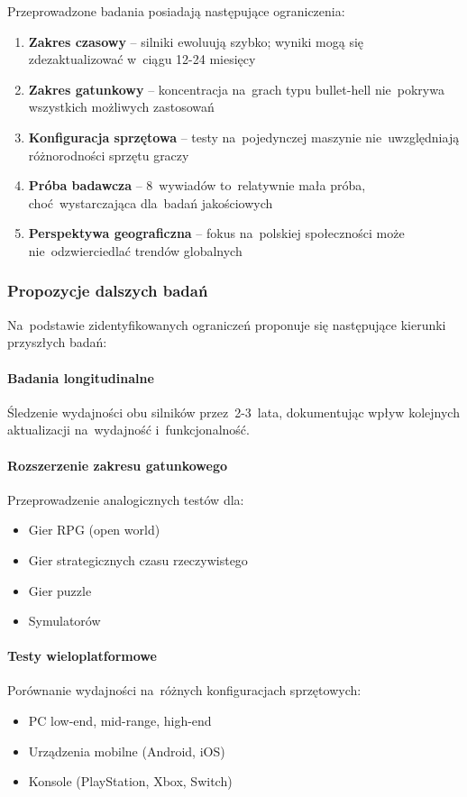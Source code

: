 Przeprowadzone badania posiadają następujące ograniczenia:

\begin{enumerate}
    \item \textbf{Zakres czasowy} -- silniki ewoluują szybko; wyniki mogą się zdezaktualizować w~ciągu 12-24 miesięcy
    \item \textbf{Zakres gatunkowy} -- koncentracja na~grach typu bullet-hell nie~pokrywa wszystkich możliwych zastosowań
    \item \textbf{Konfiguracja sprzętowa} -- testy na~pojedynczej maszynie nie~uwzględniają różnorodności sprzętu graczy
    \item \textbf{Próba badawcza} -- 8~wywiadów to~relatywnie mała próba, choć~wystarczająca dla~badań jakościowych
    \item \textbf{Perspektywa geograficzna} -- fokus na~polskiej społeczności może nie~odzwierciedlać trendów globalnych
\end{enumerate}

\subsubsection{Propozycje dalszych badań}

Na~podstawie zidentyfikowanych ograniczeń proponuje się następujące kierunki przyszłych badań:

\paragraph{Badania longitudinalne}
Śledzenie wydajności obu silników przez~2-3~lata, dokumentując wpływ kolejnych aktualizacji na~wydajność i~funkcjonalność.

\paragraph{Rozszerzenie zakresu gatunkowego}
Przeprowadzenie analogicznych testów dla:
\begin{itemize}
    \item Gier RPG (open world)
    \item Gier strategicznych czasu rzeczywistego
    \item Gier puzzle
    \item Symulatorów
\end{itemize}

\paragraph{Testy wieloplatformowe}
Porównanie wydajności na~różnych konfiguracjach sprzętowych:
\begin{itemize}
    \item PC low-end, mid-range, high-end
    \item Urządzenia mobilne (Android, iOS)
    \item Konsole (PlayStation, Xbox, Switch)
\end{itemize}

